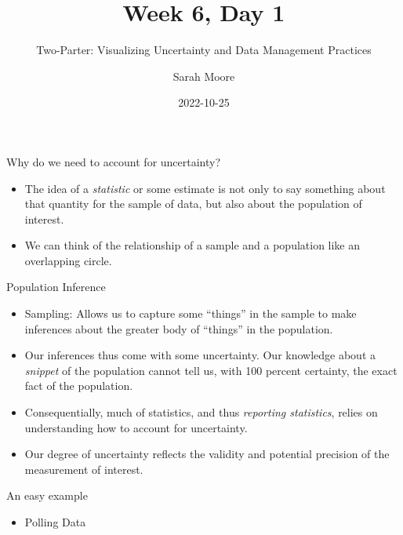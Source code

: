 \documentclass[
  ignorenonframetext,
]{beamer}
\title{Week 6, Day 1}
\subtitle{Two-Parter: Visualizing Uncertainty and Data Management
Practices}
\author{Sarah Moore}
\date{2022-10-25}
\providecommand{\tightlist}{%
  \setlength{\itemsep}{0pt}\setlength{\parskip}{0pt}}
\begin{document}
\frame{\titlepage}

\begin{frame}{Why do we need to account for uncertainty?}
\protect\hypertarget{why-do-we-need-to-account-for-uncertainty}{}
\begin{itemize}
\item
  The idea of a \emph{statistic} or some estimate is not only to say
  something about that quantity for the sample of data, but also about
  the population of interest.
\item
  We can think of the relationship of a sample and a population like an
  overlapping circle.
\end{itemize}

\centering 
{}
\end{frame}

\begin{frame}{Population Inference}
\protect\hypertarget{population-inference}{}
\centering 
{}

\begin{itemize}
\item
  Sampling: Allows us to capture some ``things'' in the sample to make
  inferences about the greater body of ``things'' in the population.
\item
  Our inferences thus come with some uncertainty. Our knowledge about a
  \emph{snippet} of the population cannot tell us, with 100 percent
  certainty, the exact fact of the population.
\item
  Consequentially, much of statistics, and thus \emph{reporting
  statistics}, relies on understanding how to account for uncertainty.
\item
  Our degree of uncertainty reflects the validity and potential
  precision of the measurement of interest.
\end{itemize}
\end{frame}

\begin{frame}{An easy example}
\protect\hypertarget{an-easy-example}{}
\begin{itemize}
\tightlist
\item
  Polling Data
\end{itemize}
\end{frame}
\end{document}

